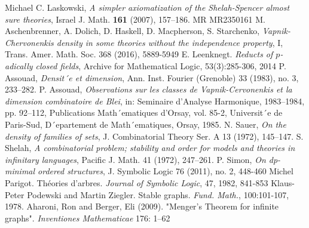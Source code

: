 \documentclass{report}
\begin{document}
\begin{thebibliography}{9}

  
  Michael C. Laskowski, \textit{A simpler axiomatization of the Shelah-Spencer almost sure theories},
  Israel J. Math. \textbf{161} (2007), 157–186. MR MR2350161	
  M. Aschenbrenner, A. Dolich, D. Haskell, D. Macpherson, S. Starchenko,
  \textit{Vapnik-Chervonenkis density in some theories without the independence property}, I,
  Trans. Amer. Math. Soc. 368 (2016), 5889-5949
  E. Leenknegt. \textit{Reducts of $p$-adically closed fields}, Archive for Mathematical Logic, 53(3):285-306, 2014
  P. Assouad, \textit{Densit´e et dimension}, Ann. Inst. Fourier (Grenoble) 33 (1983), no. 3, 233–282.
  P. Assouad, \textit{Observations sur les classes de Vapnik-Cervonenkis et la dimension combinatoire de Blei},
  in: Seminaire d’Analyse Harmonique, 1983–1984, pp. 92–112, Publications Math´ematiques
  d’Orsay, vol. 85-2, Universit´e de Paris-Sud, D´epartement de Math´ematiques, Orsay, 1985.
  N. Sauer, \textit{On the density of families of sets}, J. Combinatorial Theory Ser. A 13 (1972), 145–147.
  S. Shelah, \textit{A combinatorial problem; stability and order for models and theories in infinitary languages},
  Pacific J. Math. 41 (1972), 247–261.
  P. Simon,
  \textit{On dp-minimal ordered structures},
  J. Symbolic Logic 76 (2011), no. 2, 448-460
  Michel Parigot.
  Th\'eories d'arbres.
  \textit{Journal of Symbolic Logic}, 47, 1982, 841-853
	Klaus-Peter Podewski and Martin Ziegler. Stable graphs. \textit{Fund. Math.}, 100:101-107, 1978.
	Aharoni, Ron and Berger, Eli (2009). "Menger's Theorem for infinite graphs". \textit{Inventiones Mathematicae} 176: 1–62

\end{thebibliography}
\end{document}
